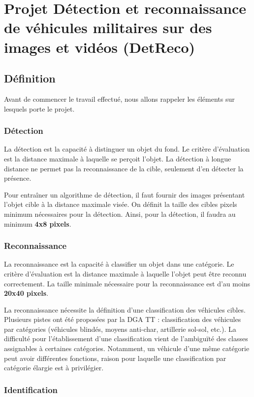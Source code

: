 \chapter{Projet Détection et reconnaissance de véhicules militaires sur des images et vidéos (DetReco)}
\label{chap:3}
\sloppy

\section{Définition}

Avant de commencer le travail effectué, nous allons rappeler les éléments sur lesquels porte le projet.
\subsection{Détection}
La détection est la capacité à distinguer un objet du fond. Le critère d'évaluation est la distance maximale à laquelle se perçoit l'objet. La détection à longue distance ne permet pas la reconnaissance de la cible, seulement d'en détecter la présence.

Pour entraîner un algorithme de détection, il faut fournir des images présentant l'objet cible à la distance maximale visée. On définit la taille des cibles pixels minimum nécessaires pour la détection. Ainsi, pour la détection, il faudra au minimum \textbf{4x8 pixels}.


\subsection{Reconnaissance}

La reconnaissance est la capacité à classifier un objet dans une catégorie. Le critère d'évaluation est la distance maximale à laquelle l'objet peut être reconnu correctement. La taille minimale nécessaire pour la reconnaissance est d'au moins \textbf{20x40 pixels}.

La reconnaissance nécessite la définition d'une classification des véhicules cibles. Plusieurs pistes ont été proposées par la DGA TT : classification des véhicules par catégories (véhicules blindés, moyens anti-char, artillerie sol-sol, etc.). La difficulté pour l'établissement d'une classification vient de l'ambiguïté des classes assignables à certaines catégories. Notamment, un véhicule d'une même catégorie peut avoir différentes fonctions, raison pour laquelle une classification par catégorie élargie est à privilégier.


\subsection{Identification}

